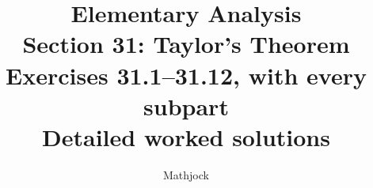 
\title{\textbf{Elementary Analysis}\\[0.3em]
Section 31: Taylor's Theorem\\[0.4em]
\large Exercises 31.1--31.12, with every subpart\\
Detailed worked solutions}
\author{Mathjock}
\date{}

\maketitle
\bookinfo
\tableofcontents
\clearpage
\setcounter{section}{30}


